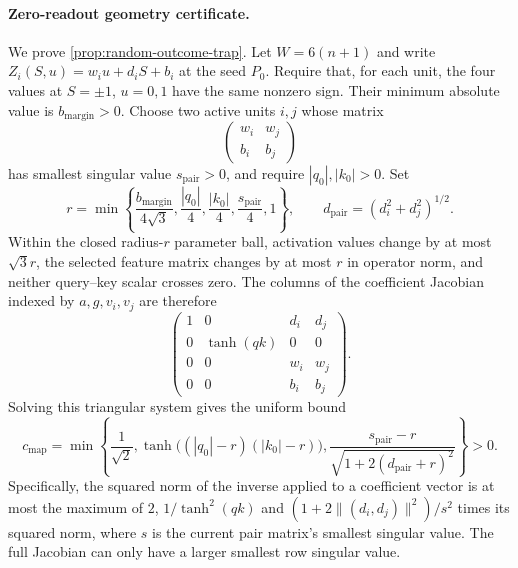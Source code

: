 \paragraph{Zero-readout geometry certificate.}
\label{app:random-trap-certificate}
We prove \cref{prop:random-outcome-trap}. Let $W=6(n+1)$ and write
$Z_i(S,u)=w_i u+d_iS+b_i$ at the seed $P_0$.
Require that, for each unit, the four values at $S=\pm1$, $u=0,1$ have the same
nonzero sign. Their minimum absolute value is $b_{\mathrm{margin}}>0$.
Choose two active units $i,j$ whose matrix
\[
 \begin{pmatrix}w_i&w_j\\b_i&b_j\end{pmatrix}
\]
has smallest singular value $s_{\mathrm{pair}}>0$, and require $|q_0|,|k_0|>0$. Set
\[
 r=\min\left\{\frac{b_{\mathrm{margin}}}{4\sqrt3},
 \frac{|q_0|}{4},\frac{|k_0|}{4},\frac{s_{\mathrm{pair}}}{4},1\right\},
 \qquad d_{\mathrm{pair}}=(d_i^2+d_j^2)^{1/2}.
\]
Within the closed radius-$r$ parameter ball, activation values change by at most
$\sqrt3r$, the selected feature matrix changes by at most $r$ in operator norm,
and neither query--key scalar crosses zero. The columns of the coefficient
Jacobian indexed by $a,g,v_i,v_j$ are therefore
\[
 \begin{pmatrix}
 1&0&d_i&d_j\\0&\tanh(qk)&0&0\\0&0&w_i&w_j\\0&0&b_i&b_j
 \end{pmatrix}.
\]
Solving this triangular system gives the uniform bound
\begin{equation}
 c_{\mathrm{map}}=
 \min\left\{\frac1{\sqrt2},
 \tanh\bigl((|q_0|-r)(|k_0|-r)\bigr),
 \frac{s_{\mathrm{pair}}-r}{\sqrt{1+2(d_{\mathrm{pair}}+r)^2}}\right\}>0.
 \label{eq:random-trap-map}
\end{equation}
Specifically, the squared norm of the inverse applied to a coefficient vector
is at most the maximum of $2$, $1/\tanh^2(qk)$ and
$(1+2\|(d_i,d_j)\|^2)/s^2$ times its squared norm, where $s$ is the
current pair matrix's smallest singular value. The full Jacobian can only have
a larger smallest row singular value.

